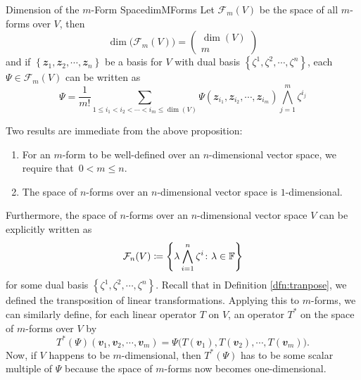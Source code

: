 \documentclass[math]{amznotes}
\theoremstyle{remark}
\begin{document}
\begin{probox}{Dimension of the $m$-Form Space}{dimMForms}
    Let $\mathcal{F}_m(V)$ be the space of all $m$-forms over $V$, then 
    \begin{equation*}
        \dim\bigl(\mathcal{F}_m(V)\bigr) = \begin{pmatrix}
            \dim(V) \\
            m
        \end{pmatrix}
    \end{equation*}
    and if  $\left\{\mathbfit{z}_1, \mathbfit{z}_2, \cdots, \mathbfit{z}_n\right\}$ be a basis for $V$ with dual basis $\left\{\zeta^1, \zeta^2, \cdots, \zeta^n\right\}$, each $\Psi \in \mathcal{F}_m(V)$ can be written as 
    \begin{equation*}
        \Psi = \frac{1}{m!}\sum_{1 \leq i_1 < i_2 < \cdots < i_m \leq \dim(V)}\Psi\left(\mathbfit{z}_{i_1}, \mathbfit{z}_{i_2}, \cdots, \mathbfit{z}_{i_m}\right)\bigwedge_{j = 1}^m\zeta^{i_j}
    \end{equation*}
\end{probox}
Two results are immediate from the above proposition:
\begin{enumerate}
    \item For an $m$-form to be well-defined over an $n$-dimensional vector space, we require that~$0 < m \leq n$.
    \item The space of $n$-forms over an $n$-dimensional vector space is $1$-dimensional.
\end{enumerate}
Furthermore, the space of $n$-forms over an $n$-dimensional vector space $V$ can be explicitly written as 
\begin{equation*}
    \mathcal{F}_n(V) \coloneqq \left\{\lambda\bigwedge_{i = 1}^n\zeta^i \colon \lambda \in \mathbb{F}\right\}
\end{equation*}
for some dual basis $\left\{\zeta^1, \zeta^2, \cdots, \zeta^n\right\}$. Recall that in Definition \ref{dfn:tranpose}, we defined the transposition of linear transformations. Applying this to $m$-forms, we can similarly define, for each linear operator $T$ on $V$, an operator $T^*$ on the space of $m$-forms over $V$ by
\begin{equation*}
    T^*(\Psi)\left(\mathbfit{v}_1, \mathbfit{v}_2, \cdots, \mathbfit{v}_m\right) = \Psi\bigl(T(\mathbfit{v}_1), T(\mathbfit{v}_2), \cdots, T(\mathbfit{v}_m)\bigr).
\end{equation*}
Now, if $V$ happens to be $m$-dimensional, then $T^*(\Psi)$ has to be some scalar multiple of $\Psi$ because the space of $m$-forms now becomes one-dimensional.
\end{document}
